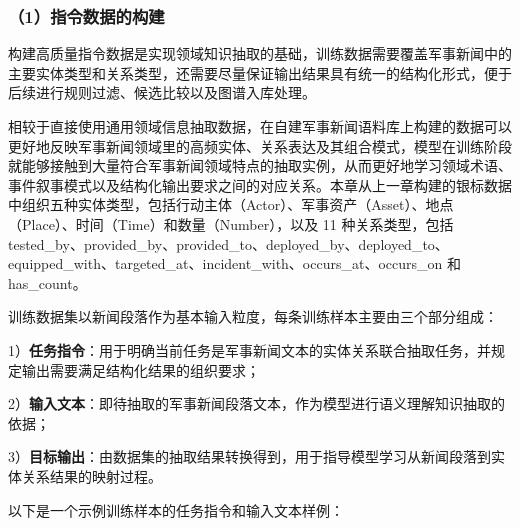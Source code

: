\subsubsection*{（1）指令数据的构建}

构建高质量指令数据是实现领域知识抽取的基础，训练数据需要覆盖军事新闻中的主要实体类型和关系类型，还需要尽量保证输出结果具有统一的结构化形式，便于后续进行规则过滤、候选比较以及图谱入库处理。

相较于直接使用通用领域信息抽取数据，在自建军事新闻语料库上构建的数据可以更好地反映军事新闻领域里的高频实体、关系表达及其组合模式，模型在训练阶段就能够接触到大量符合军事新闻领域特点的抽取实例，从而更好地学习领域术语、事件叙事模式以及结构化输出要求之间的对应关系。本章从上一章构建的银标数据中组织五种实体类型，包括行动主体（Actor）、军事资产（Asset）、地点（Place）、时间（Time）和数量（Number），以及 11 种关系类型，包括 tested\_by、provided\_by、provided\_to、deployed\_by、deployed\_to、equipped\_with、targeted\_at、incident\_with、occurs\_at、occurs\_on 和 has\_count。

训练数据集以新闻段落作为基本输入粒度，每条训练样本主要由三个部分组成：

1）\textbf{任务指令}：用于明确当前任务是军事新闻文本的实体关系联合抽取任务，并规定输出需要满足结构化结果的组织要求；

2）\textbf{输入文本}：即待抽取的军事新闻段落文本，作为模型进行语义理解知识抽取的依据；

3）\textbf{目标输出}：由数据集的抽取结果转换得到，用于指导模型学习从新闻段落到实体关系结果的映射过程。

以下是一个示例训练样本的任务指令和输入文本样例：


